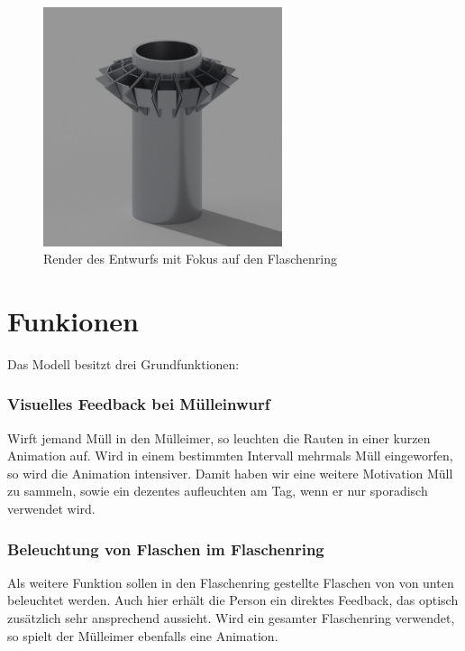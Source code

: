     \begin{figure}[H]
        \begin{center}
            \includegraphics[width=7cm]{media/01_project/render_bin.jpg}
        \end{center}
        \caption{Render des Entwurfs mit Fokus auf den Flaschenring}
        \label{fig:pencil_bin_3}
    \end{figure}

\section{Funkionen}\label{cpt:funktionen}

    Das Modell besitzt drei Grundfunktionen:

    \subsubsection{Visuelles Feedback bei Mülleinwurf}
        
        Wirft jemand Müll in den Mülleimer, so leuchten die Rauten in einer kurzen Animation auf.
        Wird in einem bestimmten Intervall mehrmals Müll eingeworfen, so wird die Animation intensiver. Damit haben wir eine weitere Motivation Müll zu sammeln, sowie ein dezentes aufleuchten am Tag, wenn er nur sporadisch verwendet wird.
      

    \subsubsection{Beleuchtung von Flaschen im Flaschenring}

        Als weitere Funktion sollen in den Flaschenring gestellte Flaschen von von unten beleuchtet werden. Auch hier erhält die Person ein direktes Feedback, das optisch zusätzlich sehr ansprechend aussieht.
        Wird ein gesamter Flaschenring verwendet, so spielt der Mülleimer ebenfalls eine Animation.


